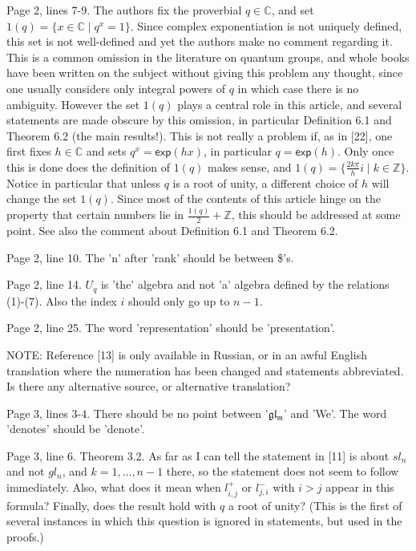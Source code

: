 \documentclass[11pt,fleqn]{article}
\newcommand\CC{\mathbb C}
\newcommand\ZZ{\mathbb Z}
\begin{document}
Page 2, lines 7-9. The authors fix the proverbial $q \in \CC$, and set $1(q) 
= \{x \in \CC \mid q^x = 1\}$. Since complex exponentiation is not uniquely 
defined, this set is not well-defined and yet the authors make no comment 
regarding it. This is a common omission in the literature on quantum groups,
and whole books have been written on the subject without giving this problem 
any thought, since one usually considers only integral powers of $q$ in which 
case there is no ambiguity. However the set $1(q)$ plays a central role in 
this article, and several statements are made obscure by this omission, in 
particular Definition 6.1 and Theorem 6.2 (the main results!). This is not 
really a problem if, as in [22], one first fixes $h \in \CC$ and sets $q^x = 
\mathsf{exp}(hx)$, in particular $q = \mathsf{exp}(h)$. Only once this is done 
does the definition of $1(q)$ makes sense, and $1(q) = \{\frac{2 k \pi}{h}i 
\mid k \in \ZZ\}$. Notice in particular that unless $q$ is a root of unity, a 
different choice of $h$ will change the set $1(q)$. Since most of the contents 
of this article hinge on the property that certain numbers lie in 
$\frac{1(q)}{2} + \ZZ$, this should be addressed at some point. See also the
comment about Definition 6.1 and Theorem 6.2.

Page 2, line 10. The 'n' after 'rank' should be between \$'s.

Page 2, line 14. $U_q$ is 'the' algebra and not 'a' algebra defined by the 
relations (1)-(7). Also the index $i$ should only go up to $n-1$.

Page 2, line 25. The word 'representation' should be 'presentation'.

NOTE: Reference [13] is only available in Russian, or in an awful
English translation where the numeration has been changed and statements 
abbreviated. Is there any alternative source, or alternative translation?

Page 3, lines 3-4. There should be no point between '$\mathfrak{gl_m}$' and 
'We'. The word 'denotes' should be 'denote'.

Page 3, line 6. Theorem 3.2.
As far as I can tell the statement in [11] is about $sl_n$ and not 
$gl_n$, and $k = 1, \ldots, n-1$ there, so the statement does not seem to
follow immediately. Also, what does it mean when $l_{i,j}^+$ or $l_{j,i}^-$ 
with $i > j$ appear in this formula? Finally, does the result hold with $q$ a 
root of unity? (This is the first of several instances in which this question
is ignored in statements, but used in the proofs.)
\end{document}
